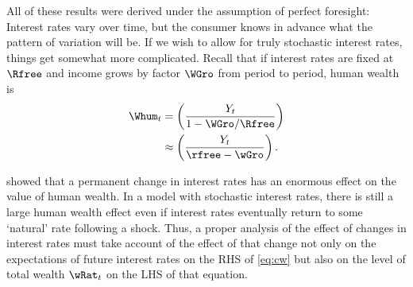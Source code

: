 \documentclass{handout}
\begin{document}
All of these results were derived under the assumption of perfect
foresight:  Interest rates vary over time, but the consumer knows in
advance what the pattern of variation will be.  If we wish to allow
for truly stochastic interest rates, things get somewhat more
complicated.  Recall that if interest rates are fixed at $\Rfree$ and
income grows by factor $\WGro$ from period to period, human wealth is
\begin{equation}\begin{gathered}\begin{aligned}
        \Whum_{t} & =  \left(\frac{Y_{t}}{1-\WGro/\Rfree}\right)
\\   & \approx  \left(\frac{Y_{t}}{\rfree-\wGro}\right).        
\end{aligned}\end{gathered}\end{equation}

\cite{summersCapTax} showed that a permanent change in
interest rates has an enormous effect on the value of human wealth.
In a model with stochastic interest rates, there is still a large
human wealth effect even if interest rates eventually return to some
`natural' rate following a shock.  Thus, a proper analysis of the
effect of changes in interest rates must take account of the effect of
that change not only on the expectations of future interest rates on
the RHS of \eqref{eq:cw} but also on the level of total wealth $\wRat_{t}$
on the LHS of that equation.



\end{document}
